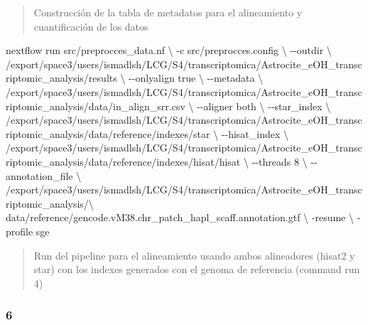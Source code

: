 \documentclass[
  9pt,
]{article}
\newenvironment{Shaded}{\begin{snugshade}}{\end{snugshade}}
\newcommand{\NormalTok}[1]{\textcolor[rgb]{0.00,0.23,0.31}{#1}}
\begin{document}
\begin{quote}
Construcción de la tabla de metadatos para el alineamiento y
cuantificación de los datos
\end{quote}

\begin{Shaded}
\begin{Highlighting}[]

\NormalTok{nextflow run src/preprocces\_data.nf \textbackslash{}}
\NormalTok{{-}c src/preprocces.config \textbackslash{}}
\NormalTok{{-}{-}outdir \textbackslash{}}
\NormalTok{/export/space3/users/ismadlsh/LCG/S4/transcriptomica/Astrocite\_eOH\_transcriptomic\_analysis/results \textbackslash{}}
\NormalTok{{-}{-}onlyalign true \textbackslash{}}
\NormalTok{{-}{-}metadata \textbackslash{}}
\NormalTok{/export/space3/users/ismadlsh/LCG/S4/transcriptomica/Astrocite\_eOH\_transcriptomic\_analysis/data/in\_align\_srr.csv \textbackslash{}}
\NormalTok{{-}{-}aligner both \textbackslash{}}
\NormalTok{{-}{-}star\_index \textbackslash{}}
\NormalTok{/export/space3/users/ismadlsh/LCG/S4/transcriptomica/Astrocite\_eOH\_transcriptomic\_analysis/data/reference/indexes/star \textbackslash{}}
\NormalTok{{-}{-}hisat\_index \textbackslash{}}
\NormalTok{/export/space3/users/ismadlsh/LCG/S4/transcriptomica/Astrocite\_eOH\_transcriptomic\_analysis/data/reference/indexes/hisat/hisat \textbackslash{}}
\NormalTok{{-}{-}threads 8 \textbackslash{}}
\NormalTok{{-}{-}annotation\_file \textbackslash{}}
\NormalTok{/export/space3/users/ismadlsh/LCG/S4/transcriptomica/Astrocite\_eOH\_transcriptomic\_analysis/\textbackslash{}}
\NormalTok{data/reference/gencode.vM38.chr\_patch\_hapl\_scaff.annotation.gtf \textbackslash{}}
\NormalTok{{-}resume \textbackslash{}}
\NormalTok{{-}profile sge}
\end{Highlighting}
\end{Shaded}

\begin{quote}
Run del pipeline para el alineamiento usando ambos alineadores (hisat2 y
star) con los indexes generados con el genoma de referencia (command run
4)
\end{quote}

\subsubsection{6}\label{section-5}
\end{document}
